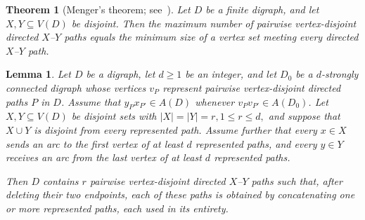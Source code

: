 \documentclass[11pt,a4paper]{article}
\newtheorem{theorem}{Theorem}[section]
\newtheorem{lemma}[lemma]{Lemma}
\theoremstyle{remark}
\numberwithin{equation}{section}
\begin{document}
	\begin{theorem}[Menger's theorem; see~\cite{BG,BM}]
		\label{thm:menger}
		Let $D$ be a finite digraph, and let $X,Y\subseteq V(D)$ be
		disjoint. Then the maximum number of pairwise vertex-disjoint
		directed $X$--$Y$ paths equals the minimum size of a vertex set
		meeting every directed $X$--$Y$ path.
	\end{theorem}
	
	\begin{lemma}\label{lem:linkage}
		Let $D$ be a digraph, let $d\ge1$ be an integer, and let $D_0$
		be a $d$-strongly connected digraph whose vertices $v_P$ represent
		pairwise vertex-disjoint directed paths $P$ in $D$.
		Assume that $y_Px_{P'}\in A(D)$ whenever $v_Pv_{P'}\in A(D_0)$.
		Let $X,Y\subseteq V(D)$ be disjoint sets with
		$|X|=|Y|=r, 1\le r\le d,$
		and suppose that $X\cup Y$ is disjoint from every represented
		path.
		Assume further that every $x\in X$ sends an arc to the first
		vertex of at least $d$ represented paths, and every $y\in Y$
		receives an arc from the last vertex of at least $d$ represented
		paths.
		
		Then $D$ contains $r$ pairwise vertex-disjoint directed
		$X$--$Y$ paths such that, after deleting their two endpoints,
		each of these paths is obtained by concatenating one or more
		represented paths, each used in its entirety.
	\end{lemma}
	
\end{document}
